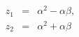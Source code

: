 \begin{equation}
\begin{array}{rcl}
z_{1}&=&\alpha^{2}-\alpha\beta,\\
z_{2}&=&\alpha^{2}+\alpha\beta\\
\end{array}
\end{equation}

